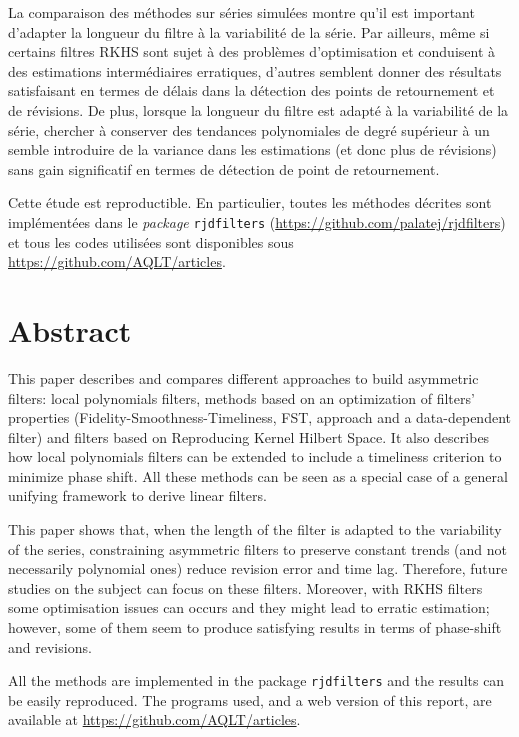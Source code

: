 \documentclass[
  12pt,
  french,
  12pt,a4paper]{article}
\newcommand\1{\mathds{1}}
\begin{document}
La comparaison des méthodes sur séries simulées montre qu'il est
important d'adapter la longueur du filtre à la variabilité de la série.
Par ailleurs, même si certains filtres RKHS sont sujet à des problèmes
d'optimisation et conduisent à des estimations intermédiaires
erratiques, d'autres semblent donner des résultats satisfaisant en
termes de délais dans la détection des points de retournement et de
révisions. De plus, lorsque la longueur du filtre est adapté à la
variabilité de la série, chercher à conserver des tendances polynomiales
de degré supérieur à un semble introduire de la variance dans les
estimations (et donc plus de révisions) sans gain significatif en termes
de détection de point de retournement.

Cette étude est reproductible. En particulier, toutes les méthodes
décrites sont implémentées dans le \emph{package} 
\texttt{rjdfilters} (\url{https://github.com/palatej/rjdfilters}) et
tous les codes utilisées sont disponibles sous
\url{https://github.com/AQLT/articles}.

\hypertarget{abstract}{%
\section*{Abstract}\label{abstract}}

This paper describes and compares different approaches to build
asymmetric filters: local polynomials filters, methods based on an
optimization of filters' properties (Fidelity-Smoothness-Timeliness,
FST, approach and a data-dependent filter) and filters based on
Reproducing Kernel Hilbert Space. It also describes how local
polynomials filters can be extended to include a timeliness criterion to
minimize phase shift. All these methods can be seen as a special case of
a general unifying framework to derive linear filters.

This paper shows that, when the length of the filter is adapted to the
variability of the series, constraining asymmetric filters to preserve
constant trends (and not necessarily polynomial ones) reduce revision
error and time lag. Therefore, future studies on the subject can focus
on these filters. Moreover, with RKHS filters some optimisation issues
can occurs and they might lead to erratic estimation; however, some of
them seem to produce satisfying results in terms of phase-shift and
revisions.

All the methods are implemented in the  package
\texttt{rjdfilters} and the results can be easily reproduced. The
programs used, and a web version of this report, are available at
\url{https://github.com/AQLT/articles}.
\end{document}
